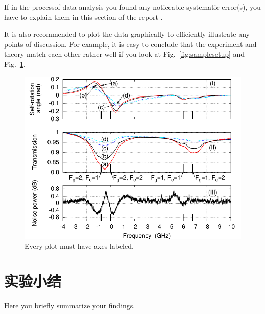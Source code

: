 \documentclass[UTF8,a4paper,12pt]{article}
\begin{document}
If in the process\cite{chen}of data analysis you found any noticeable systematic
	error(s), you have to explain them in this section of the report\cite{witthaut} .

It is also recommended to plot the data graphically to efficiently illustrate
any points of discussion. For example, it is easy to conclude that the
experiment and theory match each other rather well \cite{peil}if you look at
Fig.~\ref{fig:samplesetup} and Fig.~\ref{fig:exp_plots}.

\begin{figure}[ht] 
  \centering
      \includegraphics[width=0.5\columnwidth]{sr_squeezing_vs_detuning}

        \caption{
                \label{fig:exp_plots}  
                Every plot must have axes labeled.
        }
\end{figure}


\section{实验小结}
Here you briefly summarize your findings.








\end{document}

